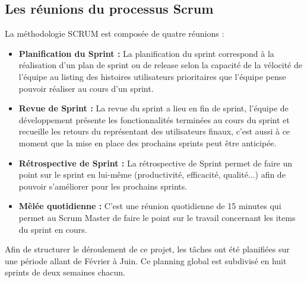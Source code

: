 \subsection{Les réunions du processus Scrum}
\label{subsec:reunions_scrum}

La méthodologie SCRUM est composée de quatre réunions :

\begin{itemize}
    \item \textbf{Planification du Sprint :} La planification du sprint correspond à la réalisation d’un plan de sprint ou de release selon la capacité de la vélocité de l’équipe au listing des histoires utilisateurs prioritaires que l’équipe pense pouvoir réaliser au cours d’un sprint.
    \item \textbf{Revue de Sprint :} La revue du sprint a lieu en fin de sprint, l’équipe de développement présente les fonctionnalités terminées au cours du sprint et recueille les retours du représentant des utilisateurs finaux, c’est aussi à ce moment que la mise en place des prochains sprints peut être anticipée.
    \item \textbf{Rétrospective de Sprint :} La rétrospective de Sprint permet de faire un point sur le sprint en lui-même (productivité, efficacité, qualité...) afin de pouvoir s’améliorer pour les prochains sprints.
    \item \textbf{Mêlée quotidienne :} C’est une réunion quotidienne de 15 minutes qui permet au Scrum Master de faire le point sur le travail concernant les items du sprint en cours.
\end{itemize}

Afin de structurer le déroulement de ce projet, les tâches ont été planifiées sur une période allant de Février à Juin. Ce planning global est subdivisé en huit sprints de deux semaines chacun.

%

